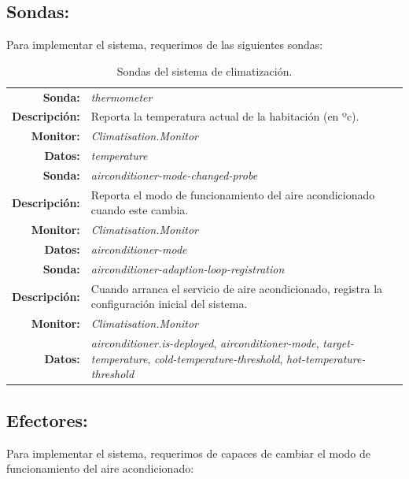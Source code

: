 \subsection{Sondas:}

Para implementar el sistema, requerimos de las siguientes sondas:

\begin{table}[htb]
  \centering

  \begin{tabular}{|r p{11.5cm}|}
    \hline
    \textbf{Sonda:} & \emph{thermometer}  \\
    \textbf{Descripción:} & Reporta la temperatura actual de la habitación (en ºc). \\
    \textbf{Monitor:} & \emph{Climatisation.Monitor} \\
    \textbf{Datos:} & \emph{temperature} \\
    \hline
    \textbf{Sonda:} & \emph{airconditioner-mode-changed-probe}  \\
    \textbf{Descripción:} & Reporta el modo de funcionamiento del aire acondicionado cuando este cambia. \\
    \textbf{Monitor:} & \emph{Climatisation.Monitor} \\
    \textbf{Datos:} & \emph{airconditioner-mode} \\
    \hline
    \textbf{Sonda:} & \emph{airconditioner-adaption-loop-registration}  \\
    \textbf{Descripción:} & Cuando arranca el servicio de aire acondicionado, registra la configuración inicial del sistema. \\
    \textbf{Monitor:} & \emph{Climatisation.Monitor} \\
    \textbf{Datos:} & \emph{airconditioner.is-deployed}, \emph{airconditioner-mode}, \emph{target-temperature}, \emph{cold-temperature-threshold}, \emph{hot-temperature-threshold} \\
    \hline
  \end{tabular}

  \caption{Sondas del sistema de climatización.}
  \label{tab:climatisation-probes}
\end{table}

\subsection{Efectores:}

Para implementar el sistema, requerimos de capaces de cambiar el modo de funcionamiento del aire acondicionado:

